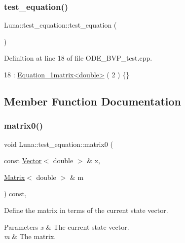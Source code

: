 \subsubsection{\texorpdfstring{test\+\_\+equation()}{test\_equation()}}
{\footnotesize\ttfamily Luna\+::test\+\_\+equation\+::test\+\_\+equation (\begin{DoxyParamCaption}{ }\end{DoxyParamCaption})\hspace{0.3cm}{\ttfamily [inline]}}



Definition at line 18 of file O\+D\+E\+\_\+\+B\+V\+P\+\_\+test.\+cpp.


\begin{DoxyCode}
18 : \hyperlink{classLuna_1_1Equation__1matrix}{Equation\_1matrix<double>} ( 2 ) \{\}
\end{DoxyCode}


\subsection{Member Function Documentation}
\mbox{\label{classLuna_1_1test__equation_a955940cd7cc59fbaef213151075f1838}} 
\subsubsection{\texorpdfstring{matrix0()}{matrix0()}}
{\footnotesize\ttfamily void Luna\+::test\+\_\+equation\+::matrix0 (\begin{DoxyParamCaption}\item[{const \hyperlink{classLuna_1_1Vector}{Vector}$<$ double $>$ \&}]{x,  }\item[{\hyperlink{classLuna_1_1Matrix}{Matrix}$<$ double $>$ \&}]{m }\end{DoxyParamCaption}) const\hspace{0.3cm}{\ttfamily [inline]}, {\ttfamily [virtual]}}



Define the matrix in terms of the current state vector. 


\begin{DoxyParams}{Parameters}
{\em x} & The current state vector. \\
\hline
{\em m} & The matrix. \\
\hline
\end{DoxyParams}


